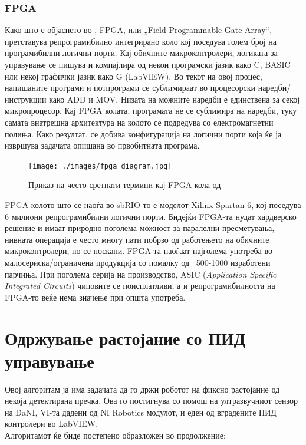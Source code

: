 \documentclass[11pt]{article}
\begin{document}
	  \subsubsection{FPGA}
		  Како што е објаснето во \cite{fpga}, FPGA, или „Field Programmable Gate Array“, претставува репрограмибилно интегрирано коло кој поседува голем број на програмибилни логични порти. Кај обичните микроконтролери, логиката за управување се пишува и компајлира од некои програмски јазик како C, BASIC или некој графички јазик како G (LabVIEW). Во текот на овој процес, напишаните програми и потпрограми се сублимираат во процесорски наредби/инструкции како ADD и MOV. Низата на можните наредби е единствена за секој микропроцесор. Кај FPGA колата, програмата не се сублимира на наредби, туку самата внатрешна архитектура на колото се подредува со електромагнетни полиња. Како резултат, се добива конфигурација на логични порти која ќе ја извршува задачата опишана во првобитната програма.

		  \begin{figure}[H]
			  \texttt{[image: ./images/fpga\_diagram.jpg]}
		  	\centering
		  	\caption{Приказ на често сретнати термини кај FPGA кола од \cite{experiments}}
		  	\label{fig:fpga_diagram_jpg}
		  	\end{figure}

		  FPGA колото што се наоѓа во sbRIO-то е моделот Xilinx Spartan 6, кој поседува 6 милиони репрограмибилни логични порти. Бидејќи FPGA-та нудат хардверско решение и имаат природно поголема можност за паралелни пресметувања, нивната операција е често многу пати побрзо од работењето на обичните микроконтролери, но се поскапи. FPGA-та наоѓаат најголема употреба во малосериска/ограничена продукција со помалку од ~500-1000 изработени парчиња. При поголема серија на производство, ASIC (\textit{Application Specific Integrated Circuits}) чиповите се поисплатливи, а и репрограмибилноста на FPGA-то веќе нема значење при општа употреба.

\newpage
\section{Одржување растојание со ПИД управување}

  Овој алгоритам ја има задачата да го држи роботот на фиксно растојание од некоја детектирана пречка. Ова го постигнува со помош на ултразвучниот сензор на DaNI, VI-та дадени од NI Robotics модулот, и еден од вградените ПИД контролери во LabVIEW.\\ Алгоритамот ќе биде постепено образложен во продолжение:
\end{document}
